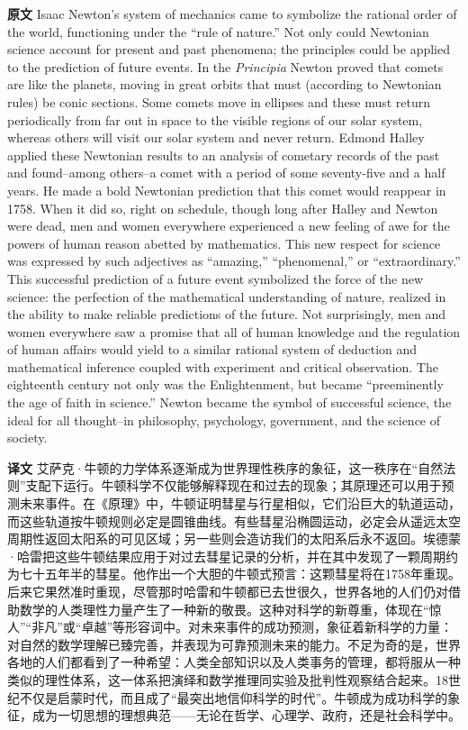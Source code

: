 \documentclass[UTF8,zihao=-4]{ctexart}
\begin{document}
\noindent\textbf{原文} Isaac Newton's system of mechanics came to symbolize the rational order of the world, functioning under the ``rule of nature.'' Not only could Newtonian science account for present and past phenomena; the principles could be applied to the prediction of future events. In the \emph{Principia} Newton proved that comets are like the planets, moving in great orbits that must (according to Newtonian rules) be conic sections. Some comets move in ellipses and these must return periodically from far out in space to the visible regions of our solar system, whereas others will visit our solar system and never return. Edmond Halley applied these Newtonian results to an analysis of cometary records of the past and found--among others--a comet with a period of some seventy-five and a half years. He made a bold Newtonian prediction that this comet would reappear in 1758. When it did so, right on schedule, though long after Halley and Newton were dead, men and women everywhere experienced a new feeling of awe for the powers of human reason abetted by mathematics. This new respect for science was expressed by such adjectives as ``amazing,'' ``phenomenal,'' or ``extraordinary.'' This successful prediction of a future event symbolized the force of the new science: the perfection of the mathematical understanding of nature, realized in the ability to make reliable predictions of the future. Not surprisingly, men and women everywhere saw a promise that all of human knowledge and the regulation of human affairs would yield to a similar rational system of deduction and mathematical inference coupled with experiment and critical observation. The eighteenth century not only was the Enlightenment, but became ``preeminently the age of faith in science.'' Newton became the symbol of successful science, the ideal for all thought--in philosophy, psychology, government, and the science of society.
\par\noindent\textbf{译文} 艾萨克·牛顿的力学体系逐渐成为世界理性秩序的象征，这一秩序在“自然法则”支配下运行。牛顿科学不仅能够解释现在和过去的现象；其原理还可以用于预测未来事件。在《原理》中，牛顿证明彗星与行星相似，它们沿巨大的轨道运动，而这些轨道按牛顿规则必定是圆锥曲线。有些彗星沿椭圆运动，必定会从遥远太空周期性返回太阳系的可见区域；另一些则会造访我们的太阳系后永不返回。埃德蒙·哈雷把这些牛顿结果应用于对过去彗星记录的分析，并在其中发现了一颗周期约为七十五年半的彗星。他作出一个大胆的牛顿式预言：这颗彗星将在1758年重现。后来它果然准时重现，尽管那时哈雷和牛顿都已去世很久，世界各地的人们仍对借助数学的人类理性力量产生了一种新的敬畏。这种对科学的新尊重，体现在“惊人”“非凡”或“卓越”等形容词中。对未来事件的成功预测，象征着新科学的力量：对自然的数学理解已臻完善，并表现为可靠预测未来的能力。不足为奇的是，世界各地的人们都看到了一种希望：人类全部知识以及人类事务的管理，都将服从一种类似的理性体系，这一体系把演绎和数学推理同实验及批判性观察结合起来。18世纪不仅是启蒙时代，而且成了“最突出地信仰科学的时代”。牛顿成为成功科学的象征，成为一切思想的理想典范——无论在哲学、心理学、政府，还是社会科学中。
\medskip
\end{document}
